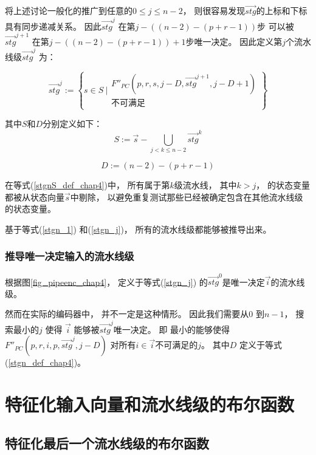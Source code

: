 将上述讨论一般化的推广到任意的$0\le j\le n-2$，
则很容易发现$\vec{stg}$的上标和下标具有同步递减关系。
因此$\vec{stg}^j$ 在第$j-((n-2)-(p+r-1))$步
可以被$\vec{stg}^{j+1}$ 在第$j-((n-2)-(p+r-1))+1$步唯一决定。
因此定义第$j$个流水线级$\vec{stg}^j$ 为：

\begin{equation}\label{stgn_j}
\vec{stg}^{j} :=
 \left\{
 s\in S ~|
\begin{array}{cc}
 F''_{PC}(p,r,s,j-D,\vec{stg}^{j+1},j-D+1)\\
不可满足
\end{array}
\right\}
\end{equation}

其中$S$和$D$分别定义如下：
\begin{equation}\label{stgnS_def_chap4}
S              :=  \vec{s}-\bigcup_{j<k\le n-2}\vec{stg}^{k}
\end{equation}

\begin{equation}\label{stgn_def_chap4}
D              :=  (n-2)-(p+r-1)
\end{equation}

在等式(\ref{stgnS_def_chap4})中，
所有属于第$k$级流水线，
其中$k>j$，
的状态变量都被从状态向量$\vec{s}$中剔除，
以避免重复测试那些已经被确定包含在其他流水线级的状态变量。

基于等式(\ref{stgn_1}) 和(\ref{stgn_j})，
所有的流水线级都能够被推导出来。

\subsubsection{推导唯一决定输入的流水线级}\label{subsec_inferinput}

根据图\ref{fig_pipeenc_chap4}，
定义于等式(\ref{stgn_j}) 的$\vec{stg}^0$是唯一决定$\vec{i}$的流水线级。

然而在实际的编码器中，
并不一定是这种情形。
因此我们需要从$0$ 到$n-1$，
搜索最小的$j$ 使得
$\vec{i}$ 能够被$\vec{stg}^j$唯一决定。
即
最小的能够使得$F''_{PC}(p,r,i,p,\vec{stg}^{j},j-D)$ 对所有$i\in \vec{i}$不可满足的$j$。
其中$D$ 定义于等式(\ref{stgn_def_chap4})。

\section{特征化输入向量和流水线级的布尔函数}\label{sec_char_chap4}
\subsection{特征化最后一个流水线级的布尔函数}

